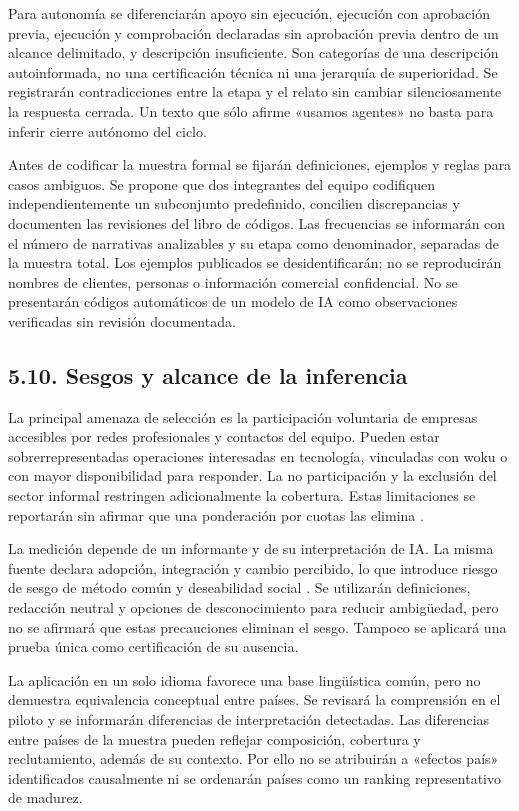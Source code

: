 \documentclass[12pt,letterpaper]{article}
\begin{document}
Para autonomía se diferenciarán apoyo sin ejecución, ejecución con aprobación previa, ejecución y comprobación declaradas sin aprobación previa dentro de un alcance delimitado, y descripción insuficiente. Son categorías de una descripción autoinformada, no una certificación técnica ni una jerarquía de superioridad. Se registrarán contradicciones entre la etapa y el relato sin cambiar silenciosamente la respuesta cerrada. Un texto que sólo afirme «usamos agentes» no basta para inferir cierre autónomo del ciclo.

Antes de codificar la muestra formal se fijarán definiciones, ejemplos y reglas para casos ambiguos. Se propone que dos integrantes del equipo codifiquen independientemente un subconjunto predefinido, concilien discrepancias y documenten las revisiones del libro de códigos. Las frecuencias se informarán con el número de narrativas analizables y su etapa como denominador, separadas de la muestra total. Los ejemplos publicados se desidentificarán; no se reproducirán nombres de clientes, personas o información comercial confidencial. No se presentarán códigos automáticos de un modelo de IA como observaciones verificadas sin revisión documentada.

\subsection*{5.10. Sesgos y alcance de la inferencia}
La principal amenaza de selección es la participación voluntaria de empresas accesibles por redes profesionales y contactos del equipo. Pueden estar sobrerrepresentadas operaciones interesadas en tecnología, vinculadas con woku o con mayor disponibilidad para responder. La no participación y la exclusión del sector informal restringen adicionalmente la cobertura. Estas limitaciones se reportarán sin afirmar que una ponderación por cuotas las elimina \citep{baker}.

La medición depende de un informante y de su interpretación de IA. La misma fuente declara adopción, integración y cambio percibido, lo que introduce riesgo de sesgo de método común y deseabilidad social \citep{pods}. Se utilizarán definiciones, redacción neutral y opciones de desconocimiento para reducir ambigüedad, pero no se afirmará que estas precauciones eliminan el sesgo. Tampoco se aplicará una prueba única como certificación de su ausencia.

La aplicación en un solo idioma favorece una base lingüística común, pero no demuestra equivalencia conceptual entre países. Se revisará la comprensión en el piloto y se informarán diferencias de interpretación detectadas. Las diferencias entre países de la muestra pueden reflejar composición, cobertura y reclutamiento, además de su contexto. Por ello no se atribuirán a «efectos país» identificados causalmente ni se ordenarán países como un ranking representativo de madurez.
\end{document}
